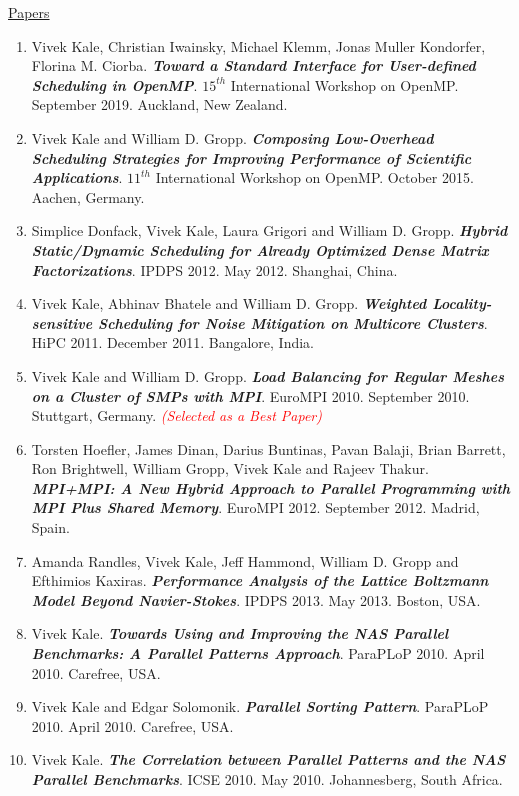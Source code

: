 




\underline{Papers}
\begin{enumerate} 
\item Vivek Kale, Christian Iwainsky, Michael Klemm, Jonas Muller Kondorfer, Florina M. Ciorba. \textbf{\textit{Toward a Standard Interface for User-defined Scheduling in OpenMP}}. $15^{th}$ International Workshop on OpenMP. September 2019. Auckland, New Zealand. 
\item Vivek Kale and William D. Gropp. \textbf{\textit{Composing Low-Overhead Scheduling Strategies for Improving Performance of Scientific Applications}}. $11^{th}$ International Workshop on OpenMP. October 2015. Aachen, Germany.
\item Simplice Donfack, Vivek Kale, Laura Grigori and William D. Gropp. \textbf{\textit{Hybrid Static/Dynamic Scheduling for Already Optimized Dense Matrix Factorizations}}. IPDPS 2012. May 2012. Shanghai, China.
\item Vivek Kale, Abhinav Bhatele and William D. Gropp. \textbf{\textit{Weighted Locality-sensitive Scheduling for
      Noise Mitigation on Multicore Clusters}}. HiPC 2011. December
  2011. Bangalore, India. 
\item Vivek Kale and William D. Gropp. \textbf{\textit{Load Balancing for Regular Meshes on a Cluster of SMPs with MPI}}. EuroMPI 2010. September 2010. Stuttgart, Germany. \textit{\textcolor{red}{(Selected as a Best Paper)}}
\item Torsten Hoefler, James Dinan, Darius Buntinas, Pavan Balaji, Brian Barrett, Ron Brightwell, William Gropp, Vivek Kale and Rajeev Thakur. \textbf{\textit{MPI+MPI: A New Hybrid Approach to Parallel Programming with MPI Plus Shared Memory}}. EuroMPI 2012. September 2012. Madrid, Spain.
\item Amanda Randles, Vivek Kale, Jeff Hammond, William D. Gropp and Efthimios Kaxiras. \textbf{\textit{Performance Analysis of the Lattice
Boltzmann Model Beyond Navier-Stokes}}. IPDPS 2013. May 2013. Boston, USA.
\item Vivek Kale. \textbf{\textit{Towards Using and Improving the NAS Parallel Benchmarks: A Parallel Patterns Approach}}. ParaPLoP 2010. April 2010. Carefree, USA.
\item Vivek Kale and Edgar Solomonik. \textbf{\textit{Parallel Sorting Pattern}}. ParaPLoP 2010. April 2010. Carefree, USA. 
\item Vivek Kale. \textbf{\textit{The Correlation between Parallel Patterns and the NAS Parallel Benchmarks}}. ICSE 2010. May 2010. Johannesberg, South Africa.
\end{enumerate} 

